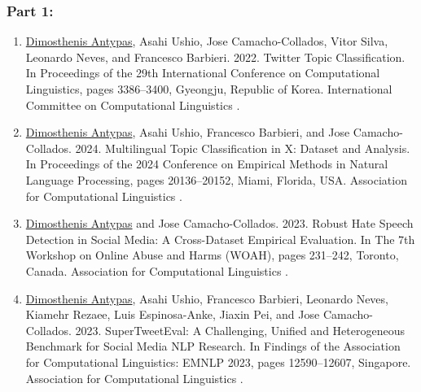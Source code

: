 \subsubsection{Part 1: \PARTONE} \label{ch:intro:publications:partone}
\begin{enumerate}
    \item \label{publication:1} \underline{Dimosthenis Antypas}, Asahi Ushio, Jose Camacho-Collados, Vitor Silva, Leonardo Neves, and Francesco Barbieri. 2022. Twitter Topic Classification. In Proceedings of the 29th International Conference on Computational Linguistics, pages 3386–3400, Gyeongju, Republic of Korea. International Committee on Computational Linguistics \cite{antypas2022twitter}. 
    
    \item \label{publication:2} \underline{Dimosthenis Antypas}, Asahi Ushio, Francesco Barbieri, and Jose Camacho-Collados. 2024. Multilingual Topic Classification in X: Dataset and Analysis. In Proceedings of the 2024 Conference on Empirical Methods in Natural Language Processing, pages 20136–20152, Miami, Florida, USA. Association for Computational Linguistics \cite{antypas-etal-2024-multilingual}. 
    
    \item \label{publication:3} \underline{Dimosthenis Antypas} and Jose Camacho-Collados. 2023. Robust Hate Speech Detection in Social Media: A Cross-Dataset Empirical Evaluation. In The 7th Workshop on Online Abuse and Harms (WOAH), pages 231–242, Toronto, Canada. Association for Computational Linguistics \cite{antypas2023robust}. 

    \item \label{publication:4} \underline{Dimosthenis Antypas}, Asahi Ushio, Francesco Barbieri, Leonardo Neves, Kiamehr Rezaee, Luis Espinosa-Anke, Jiaxin Pei, and Jose Camacho-Collados. 2023. SuperTweetEval: A Challenging, Unified and Heterogeneous Benchmark for Social Media NLP Research. In Findings of the Association for Computational Linguistics: EMNLP 2023, pages 12590–12607, Singapore. Association for Computational Linguistics \cite{antypas-etal-2023-supertweeteval}.    
\end{enumerate}


